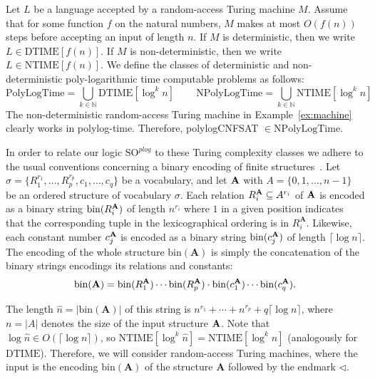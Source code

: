 \documentclass{article}
\newcommand{\polylog}{\mathrm{PolyLogTime}}
\newcommand{\npolylog}{\mathrm{NPolyLogTime}}
\begin{document}
Let $L$ be a language accepted by a random-access Turing machine $M$. Assume that for some function $f$ on the natural numbers, $M$ makes at most $O(f(n))$ steps before accepting an input of length $n$. If $M$ is deterministic, then we write $L \in \mathrm{DTIME}[f(n)]$. If $M$ is non-deterministic, then we write $L \in \mathrm{NTIME}[f(n)]$. We define the classes of deterministic and non-deterministic poly-logarithmic time computable problems as follows:
\[ \polylog = \bigcup_{k \in \mathbb{N}} \mathrm{DTIME}[\log^k n] \qquad \, \npolylog = \bigcup_{k \in \mathbb{N}} \mathrm{NTIME}[\log^k n] \]
The non-deterministic random-access Turing machine in Example~\ref{ex:machine} clearly works in polylog-time. Therefore, polylogCNFSAT $\in \npolylog$.

In order to relate our logic $\mathrm{SO}^{\mathit{plog}}$ to these Turing complexity classes we adhere to the usual conventions concerning a binary encoding of finite structures~\cite{Immerman99}. Let $\sigma = \{R^{r_1}_1, \ldots, R^{r_p}_p, c_1, \ldots, c_q\}$ be a vocabulary, and let ${\bf A}$ with $A = \{0, 1, \ldots, n-1\}$ be an ordered structure of vocabulary $\sigma$. Each relation $R_i^{\bf A} \subseteq A^{r_i}$ of $\bf A$ is encoded as a binary string $\mathrm{bin}(R^{\bf A}_i)$ of length $n^{r_i}$ where $1$ in a given position indicates that the corresponding tuple in the lexicographical ordering is in $R_i^{\textbf{A}}$.
Likewise, each constant number $c^{\bf A}_j$ is encoded as a binary string $\mathrm{bin}(c^{\bf A}_j)$ of length $\lceil \log n \rceil$. The encoding of the whole structure $\mathrm{bin}(\textbf{A})$ is simply the concatenation of the binary strings encodings its relations and constants: 
\[\mathrm{bin}(\textbf{A}) = \mathrm{bin}(R_1^{\textbf{A}}) \cdots \mathrm{bin}(R_p^{\textbf{A}}) \cdot \mathrm{bin}(c^{\bf A}_1) \cdots \mathrm{bin}(c^{\bf A}_q).\] 

The length $\hat{n} = |\mathrm{bin}(\textbf{A})|$ of this string is $n^{r_1}+\cdots+n^{r_p} + q \lceil \log n \rceil$, where $n = |A|$ denotes the size of the input structure ${\bf A}$. Note that $\log \hat{n} \in O(\lceil \log n \rceil)$, so $\mathrm{NTIME}[\log^k \hat{n}] = \mathrm{NTIME}[\log^k n]$ (analogously for $\mathrm{DTIME}$). Therefore, we will consider random-access Turing machines, where the input is the encoding $\mathrm{bin}(\textbf{A})$ of the structure \textbf{A} followed by the endmark $\triangleleft$.
\end{document}
